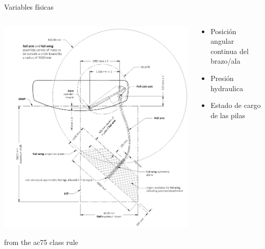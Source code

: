 \documentclass[presentation,aspectratio=169]{beamer}
\begin{document}
\begin{frame}[label={sec:orge0b0ac7}]{Variables físicas}
\begin{columns}
\begin{column}{0.5\columnwidth}
\begin{center}
\includegraphics[height=0.8\textheight]{../../figures/ac75-class-foil.png}
\end{center}

{\footnotesize from the ac75 class rule}
\end{column}
\begin{column}{0.5\columnwidth}
\begin{itemize}
\item \alert{Posición angular continua del brazo/ala}
\item Presión hydraulica
\item Estado de cargo de las pilas
\end{itemize}
\end{column}
\end{columns}
\end{frame}
\end{document}
